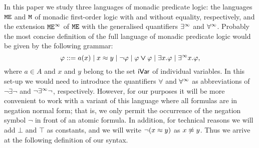 In this paper we study three languages of monadic predicate logic: the languages 
$\mathtt{M}\mathtt{E}$ and $\mathtt{M}$ of monadic first-order logic with and without equality, 
respectively, and the extension $\mathtt{M}\mathtt{E}^{\infty}$ of $\mathtt{M}\mathtt{E}$ with the 
generalised quantifiers $\exists^\infty$ and $\forall^\infty$.
Probably the most concise definition of the full language of monadic predicate 
logic would be given by the following grammar:
\[
\varphi \mathrel{::=} a(x)
\mid x \approx y
\mid \neg \varphi
\mid \varphi \mathbin{\mbox{\boldmath$\vee$}} \varphi
\mid \exists x.\varphi
\mid \exists^\infty x.\varphi,
\]
where $a \in A$ and $x$ and $y$ belong to the set $\mathsf{iVar}$ of individual 
variables.
In this set-up we would need to introduce the quantifiers $\forall$ and $\forall^\infty$ 
as abbreviations of $\neg \exists \neg$ and $\neg \exists^\infty \neg$, respectively.
However, for our purposes it will be more convenient to work with a variant of 
this language where all formulas are in negation normal form; that is, we only 
permit the occurrence of the negation symbol $\neg$ in front of an atomic 
formula.
In addition, for technical reasons we will add $\bot$ and $\top$ as constants,
and we will write $\neg (x \approx y)$ as $x \not\approx y$.
Thus we arrive at the following definition of our syntax.

